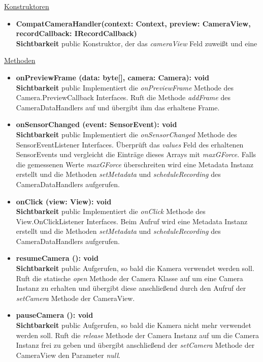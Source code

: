 \underline{Konstruktoren}
\begin{itemize}
\itemsep0pt
\item \textbf{CompatCameraHandler(context: Context, preview: CameraView, recordCallback: IRecordCallback)} \hfill\\
\textbf{Sichtbarkeit} public\newline
Konstruktor, der das \textit{cameraView} Feld zuweißt und eine 
\end{itemize}

\underline{Methoden}
\begin{itemize}
\itemsep0pt
\item \textbf{onPreviewFrame (data: byte[], camera: Camera): void}\hfill\\
\textbf{Sichtbarkeit} public\newline
Implementiert die \textit{onPreviewFrame} Methode des Camera.PreviewCallback Interfaces. Ruft die Methode \textit{addFrame} des CameraDataHandlers auf und übergibt ihm das erhaltene Frame.

\item \textbf{onSensorChanged (event: SensorEvent): void}\hfill\\
\textbf{Sichtbarkeit} public\newline
Implementiert die \textit{onSensorChanged} Methode des SensorEventListener Interfaces. Überprüft das \textit{values} Feld des erhaltenen SensorEvents und vergleicht die Einträge dieses Arrays mit \textit{maxGForce}. Falls die gemessenen Werte \textit{maxGForce} überschreiten wird eine Metadata Instanz erstellt und die Methoden \textit{setMetadata} und \textit{scheduleRecording} des CameraDataHandlers aufgerufen.

\item \textbf{onClick (view: View): void}\hfill\\
\textbf{Sichtbarkeit} public\newline
Implementiert die \textit{onClick} Methode des View.OnClickListener Interfaces. Beim Aufruf wird eine Metadata Instanz erstellt und die Methoden \textit{setMetadata} und \textit{scheduleRecording} des CameraDataHandlers aufgerufen.

\item \textbf{resumeCamera (): void}\hfill\\
\textbf{Sichtbarkeit} public\newline
Aufgerufen, so bald die Kamera verwendet werden soll. Ruft die statische \textit{open} Methode der Camera Klasse auf um eine Camera Instanz zu erhalten und übergibt diese anschließend durch den Aufruf der \textit{setCamera} Methode der CameraView.

\item \textbf{pauseCamera (): void}\hfill\\
\textbf{Sichtbarkeit} public\newline
Aufgerufen, so bald die Kamera nicht mehr verwendet werden soll. Ruft die  \textit{release} Methode der Camera Instanz auf um die Camera Instanz frei zu geben und übergibt anschließend der \textit{setCamera} Methode der CameraView den Parameter \textit{null}.

\end{itemize}